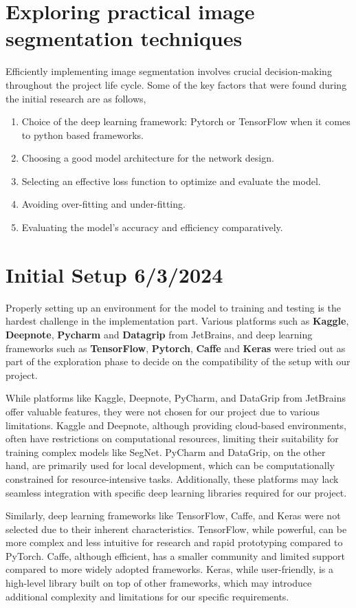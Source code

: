 \section{Exploring practical image segmentation techniques}
Efficiently implementing image segmentation involves crucial decision-making throughout the project life cycle. Some of the key factors that were found during the initial research are as follows,

\begin{enumerate}
	\item Choice of the deep learning framework: Pytorch or TensorFlow when it comes to python based frameworks.
	\item Choosing a good model architecture for the network design.
	\item Selecting an effective loss function to optimize and evaluate the model.
	\item Avoiding over-fitting and under-fitting.
	\item Evaluating the model's accuracy and efficiency comparatively.
\end{enumerate}

\section{Initial Setup 6/3/2024}
Properly setting up an environment for the model to training and testing is the hardest challenge in the implementation part. Various platforms such as \textbf{Kaggle}, \textbf{Deepnote}, \textbf{Pycharm} and \textbf{Datagrip} from JetBrains, and deep learning frameworks such as \textbf{TensorFlow}, \textbf{Pytorch}, \textbf{Caffe} and \textbf{Keras} were tried out as part of the exploration phase to decide on the compatibility of the setup with our project.

While platforms like Kaggle, Deepnote, PyCharm, and DataGrip from JetBrains offer valuable features, they were not chosen for our project due to various limitations. Kaggle and Deepnote, although providing cloud-based environments, often have restrictions on computational resources, limiting their suitability for training complex models like SegNet. PyCharm and DataGrip, on the other hand, are primarily used for local development, which can be computationally constrained for resource-intensive tasks. Additionally, these platforms may lack seamless integration with specific deep learning libraries required for our project.

Similarly, deep learning frameworks like TensorFlow, Caffe, and Keras were not selected due to their inherent characteristics. TensorFlow, while powerful, can be more complex and less intuitive for research and rapid prototyping compared to PyTorch. Caffe, although efficient, has a smaller community and limited support compared to more widely adopted frameworks. Keras, while user-friendly, is a high-level library built on top of other frameworks, which may introduce additional complexity and limitations for our specific requirements.

